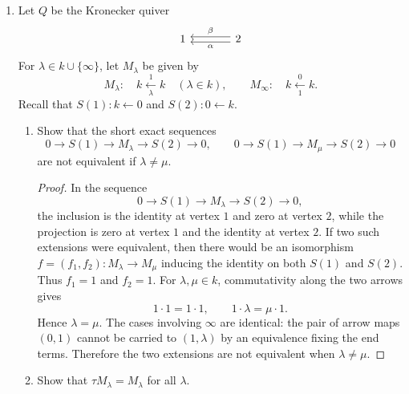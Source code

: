 \documentclass[11pt, a4paper]{article}
\begin{document}
\begin{enumerate}[leftmargin=*, label=\textbf{\arabic*.}]
\item Let $Q$ be the Kronecker quiver
\[
\begin{tikzcd}[column sep=large]
1 & 2 \arrow[l, shift left=.55ex, "\alpha"] \arrow[l, shift right=.55ex, "\beta"']
\end{tikzcd}
\]
For $\lambda\in k\cup\{\infty\}$, let $M_\lambda$ be given by
\[
M_\lambda:
\quad k \xleftarrow[\lambda]{1} k\quad (\lambda\in k),
\qquad
M_\infty:
\quad k \xleftarrow[1]{0} k.
\]
Recall that $S(1):k\leftarrow 0$ and $S(2):0\leftarrow k$.
\begin{enumerate}[label=(\alph*)]
\item Show that the short exact sequences
\[
0\to S(1)\to M_\lambda\to S(2)\to 0,
\qquad
0\to S(1)\to M_\mu\to S(2)\to 0
\]
are not equivalent if $\lambda\neq\mu$.

\begin{proof}
In the sequence
\[
0\to S(1)\to M_\lambda\to S(2)\to 0,
\]
the inclusion is the identity at vertex $1$ and zero at vertex $2$, while the projection is zero at vertex $1$ and the identity at vertex $2$.
If two such extensions were equivalent, then there would be an isomorphism
$f=(f_1,f_2):M_\lambda\to M_\mu$ inducing the identity on both $S(1)$ and $S(2)$.
Thus $f_1=1$ and $f_2=1$.
For $\lambda,\mu\in k$, commutativity along the two arrows gives
\[
1\cdot 1=1\cdot 1,
\qquad
1\cdot \lambda=\mu\cdot 1.
\]
Hence $\lambda=\mu$. The cases involving $\infty$ are identical: the pair of arrow maps $(0,1)$ cannot be carried to $(1,\lambda)$ by an equivalence fixing the end terms. Therefore the two extensions are not equivalent when $\lambda\neq\mu$.
\end{proof}

\item Show that $\tau M_\lambda=M_\lambda$ for all $\lambda$.


\end{enumerate}
\end{enumerate}
\end{document}
